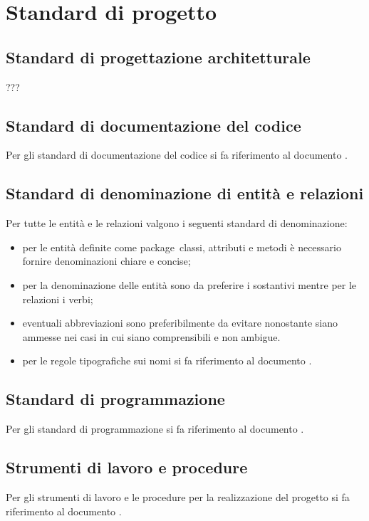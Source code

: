 \documentclass[../DefinizioneDiProdotto.tex]{subfiles}
\begin{document}
\section{Standard di progetto}
	\subsection{Standard di progettazione architetturale}
		??? 
	
	\subsection{Standard di documentazione del codice}
		Per gli standard di documentazione del codice si fa riferimento al documento \normediprogettov.

	\subsection{Standard di denominazione di entità e relazioni}
		Per tutte le entità e le relazioni valgono i seguenti standard di denominazione:
		\begin{itemize}
			\item per le entità definite come package\g\, classi, attributi e metodi è necessario fornire denominazioni chiare e concise;
			\item per la denominazione delle entità sono da preferire i sostantivi mentre per le relazioni i verbi;
			\item eventuali abbreviazioni sono preferibilmente da evitare nonostante siano ammesse nei casi in cui siano comprensibili e non ambigue.
			\item per le regole tipografiche sui nomi si fa riferimento al documento \normediprogettov.
		\end{itemize}	
		

	\subsection{Standard di programmazione}
		Per gli standard di programmazione si fa riferimento al documento \normediprogettov.

	\subsection{Strumenti di lavoro e procedure}
		Per gli strumenti di lavoro e le procedure per la realizzazione del progetto si fa riferimento al documento \normediprogettov.
	
\end{document}
